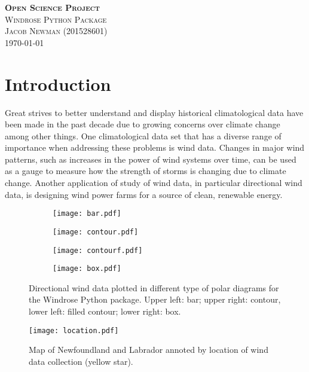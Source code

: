 \documentclass{article}
\begin{document}
\begin{titlepage}
\newcommand{\HRule}{\rule{\linewidth}{0.5mm}}

\center
\textsc{\LARGE \textbf{Open Science Project}}\\[1 cm]

\textsc{\Large Windrose Python Package}\\[0.5 cm]

\textsc{\large Jacob Newman (201528601)}\\[0.5 cm]





\vfill\vfill\vfill
{\large\today}
\vfill

\end{titlepage}


\section{Introduction}\label{Introduction}
Great strives to better understand and display historical climatological data have been made in the past decade due to growing concerns over climate change among other things. One climatological data set 
that has a diverse range of importance when addressing these problems is wind data. Changes in major wind patterns, such as increases in the power of wind systems over time, can be used as a gauge to 
measure how the strength of storms is changing due to climate change. Another application of study of wind data, in particular directional wind data, is designing wind power farms for a source of clean, 
renewable energy.   

\begin{figure}[h!]
\begin{subfigure}{.55\textwidth}
\centering
\texttt{[image: bar.pdf]}
\label{bar_windrose}
\end{subfigure}
\begin{subfigure}{.55\textwidth}
\centering
\texttt{[image: contour.pdf]}
\label{contour}
\end{subfigure}
\begin{subfigure}{.55\textwidth}
\centering
\texttt{[image: contourf.pdf]}
\label{contourf_windrose}
\end{subfigure}
\begin{subfigure}{.55\textwidth}
\centering
\texttt{[image: box.pdf]}
\label{box_windrose}
\end{subfigure}
\label{windrose_diagrams}
\caption{Directional wind data plotted in different type of polar diagrams for the Windrose Python package. 
Upper left: bar; upper right: contour, lower left: filled contour; lower right: box.}
\end{figure}

\begin{figure}[h!]
\centering
\texttt{[image: location.pdf]}
\label{location}
\caption{Map of Newfoundland and Labrador annoted by location of wind data collection (yellow star).}
\end{figure}
\end{document}

